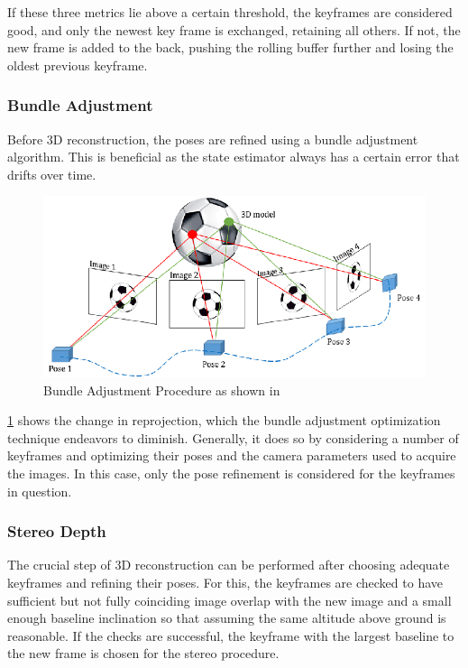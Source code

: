 \documentclass{article}
\begin{document}
If these three metrics lie above a certain threshold, the keyframes are considered good, and only the newest key frame is exchanged, retaining all others. If not, the new frame is added to the back, pushing the rolling buffer further and losing the oldest previous keyframe. 

\subsubsection{Bundle Adjustment}

Before 3D reconstruction, the poses are refined using a bundle adjustment algorithm. This is beneficial as the state estimator always has a certain error that drifts over time. 

\begin{figure}[ht!]
    \centering
    \includegraphics[scale=0.5]{images/system_overview/BA.png}
    \caption{Bundle Adjustment Procedure as shown in \citet{BA}}
    \label{fig:BA}
\end{figure}

\cref{fig:BA} shows the change in reprojection, which the bundle adjustment optimization technique endeavors to diminish. Generally, it does so by considering a number of keyframes and optimizing their poses and the camera parameters used to acquire the images. In this case, only the pose refinement is considered for the keyframes in question.
\subsubsection{Stereo Depth}\label{subsubsec:SFM_stereo}

The crucial step of 3D reconstruction can be performed after choosing adequate keyframes and refining their poses. For this, the keyframes are checked to have sufficient but not fully coinciding image overlap with the new image and a small enough baseline inclination so that assuming the same altitude above ground is reasonable. If the checks are successful, the keyframe with the largest baseline to the new frame is chosen for the stereo procedure. 
\end{document}
